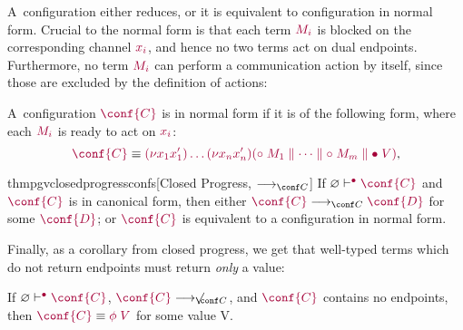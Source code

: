 \documentclass[main.tex]{subfiles}
\begin{document}
A~configuration either reduces, or it is equivalent to configuration in normal form. Crucial to the normal form is that each term $\tm{M_i}$ is blocked on the corresponding channel $\tm{x_i}$, and hence no two terms act on dual endpoints. Furthermore, no term $\tm{M_i}$ can perform a communication action by itself, since those are excluded by the definition of actions:
\begin{definition}
  A~configuration $\tm{\conf{C}}$ is in normal form if it is of the following form, where each $\tm{M_i}$ is ready to act on $\tm{x_i}$:
  \[
    \tm{\conf{C}}
    \equiv
    \tm{\res{x_1}{x'_1}{\dots\res{x_n}{x'_n}{(\child\;M_1\parallel\dots\parallel\child\;M_m\parallel\main\;V)}}},
  \]
\end{definition}
\begin{restatabletheorem}{thmpgvclosedprogressconfs}[Closed Progress, $\cred$]
  \label{lem:pgv-closed-progress-confs}
  If $\cseq[\main]{\emptyenv}{\conf{C}}$ and $\tm{\conf{C}}$ is in canonical form, then either $\tm{\conf{C}}\cred\tm{\conf{D}}$ for some $\tm{\conf{D}}$; or $\tm{\conf{C}}$ is equivalent to a configuration in normal form.
\end{restatabletheorem}


Finally, as a corollary from closed progress, we get that well-typed terms which do not return endpoints must return \emph{only} a value:
\begin{corollary}
  \label{cor:pgv-closed-progress}
  If $\cseq[\main]{\emptyenv}{\conf{C}}$, $\tm{\conf{C}}\centernot\cred$, and $\tm{\conf{C}}$ contains no endpoints, then $\tm{\conf{C}}\equiv\tm{\phi\;V}$ for some value V.
\end{corollary}
\end{document}
